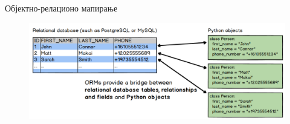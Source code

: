 \documentclass[aspectratio=169]{beamer}
\begin{document}
\begin{frame}[allowframebreaks]{Објектно-релационо мапирање}
        \begin{figure}
            \centering
            \includegraphics[width=\textwidth,height=\textheight,keepaspectratio]{images/orm.png}
            \label{fig:orm}
        \end{figure}
    \end{frame}
    
\end{document}
